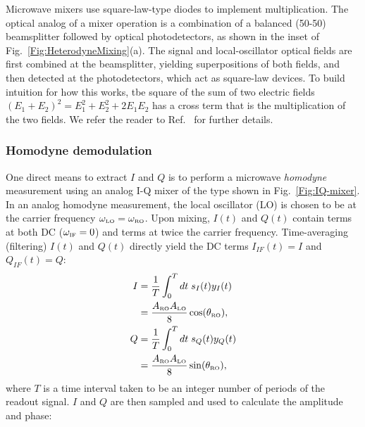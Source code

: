 \documentclass[aip,apr,twocolumn,showpacs,superscriptaddress,groupedaddress,nofootinbib,reprint]{revtex4-1}  %
\begin{document}
Microwave mixers use square-law-type diodes to implement multiplication. The optical analog of a mixer operation is a combination of a balanced (50-50) beamsplitter followed by optical photodetectors, as shown in the inset of Fig.~\ref{Fig:HeterodyneMixing}(a). The signal and local-oscillator optical fields are first combined at the beamsplitter, yielding superpositions of both fields, and then detected at the photodetectors, which act as square-law devices. To build intuition for how this works, tbe square of the sum of two electric fields $(E_1 + E_2)^2 = E_1^2 + E_2^2 + 2 E_1E_2$ has a cross term that is the multiplication of the two fields. We refer the reader to Ref.~ for further details.

\subsubsection{Homodyne demodulation}
%
One direct means to extract $I$ and $Q$ is to perform a microwave \textit{homodyne} measurement using an analog I-Q mixer of the type shown in Fig.~\ref{Fig:IQ-mixer}. %
In an analog homodyne measurement, the local oscillator (LO) is chosen to be at the carrier frequency $\omega_{\mbox{\tiny{LO}}}=\omega_{\mbox{\tiny{RO}}}$. Upon mixing, $I(t)$ and $Q(t)$ contain terms at both DC ($\omega_{\mbox{\tiny{IF}}}=0$) and terms at twice the carrier frequency. Time-averaging (filtering) $I(t)$ and $Q(t)$ directly yield the DC terms $I_{IF}(t) =I$ and $Q_{IF}(t) =  Q$:
\begin{align}
 I &= \frac{1}{T} \int_0^T dt \; s_I(t) y_I(t) \nonumber\\
   &= \frac{A_{\mbox{\tiny{RO}}}A_{\mbox{\tiny{LO}}}}{8} \cos (\theta_{\mbox{\tiny{RO}}}),  \\
 Q &= \frac{1}{T} \int_0^T dt \; s_Q(t) y_Q(t) \nonumber \\
   &= \frac{A_{\mbox{\tiny{RO}}}A_{\mbox{\tiny{LO}}}}{8} \sin (\theta_{\mbox{\tiny{RO}}}),
\end{align}
where $T$ is a time interval taken to be an integer number of periods of the readout signal. $I$ and $Q$ are then sampled and used to calculate the amplitude and phase:
\end{document}
